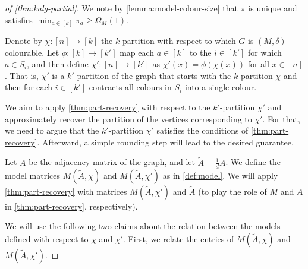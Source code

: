 \begin{proof}[of \cref{thm:kalg-partial}]
    We note by \cref{lemma:model-colour-size} that $\pi$ is unique and satisfies $\min_{a \in [k]} \pi_a \geq \Omega_M(1)$.

    Denote by $\chi: [n] \to [k]$ the $k$-partition with respect to which $G$ is $(M, \delta)$-colourable.
    Let $\phi: [k] \to [k']$ map each $a \in [k]$ to the $i \in [k']$ for which $a \in S_i$, and then define $\chi' : [n] \to [k']$ as $\chi'(x) = \phi(\chi(x))$ for all $x \in [n]$.
    That is, $\chi'$ is a $k'$-partition of the graph that starts with the $k$-partition $\chi$ and then for each $i \in [k']$ contracts all colours in $S_i$ into a single colour.

    We aim to apply \cref{thm:part-recovery} with respect to the $k'$-partition $\chi'$ and approximately recover the partition of the vertices corresponding to $\chi'$.
    For that, we need to argue that the $k'$-partition $\chi'$ satisfies the conditions of \cref{thm:part-recovery}.
    Afterward, a simple rounding step will lead to the desired guarantee.

    Let $A$ be the adjacency matrix of the graph, and let $\tilde{A} = \frac{1}{d}A$.
    We define the model matrices $M(\tilde{A}, \chi)$ and $M(\tilde{A}, \chi')$ as in \cref{def:model}.
    We will apply \cref{thm:part-recovery} with matrices $M(\tilde{A}, \chi')$ and $\tilde{A}$ (to play the role of $M$ and $A$ in \cref{thm:part-recovery}, respectively).

    We will use the following two claims about the relation between the models defined with respect to $\chi$ and $\chi'$.
    First, we relate the entries of $M(\tilde{A}, \chi)$ and $M(\tilde{A}, \chi')$.


\end{proof}
